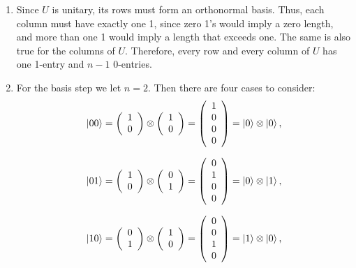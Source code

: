\documentclass [12pt]{article}
\theoremstyle{definition}
\begin{document}
\begin{enumerate}
\item Since $U$ is unitary, its rows must form an orthonormal basis. Thus, each column must have exactly one 1, since zero 1's would imply a zero length, and 
more than one 1 would imply a length that exceeds one. The same is also true for the columns of $U$. Therefore, every row and every column of $U$ has one 1-entry and $n-1$ 0-entries.

\item For the basis step we let $n=2$. Then there are four cases to consider:
\[\ket{00} = 
\left(\begin{array}{c}
1 \\
0\\
\end{array}\right)
\otimes
\left(\begin{array}{c}
1 \\
0\\
\end{array}\right)
=
\left(\begin{array}{c}
1\\
0\\
0\\
0\\
\end{array}\right)
=\ket{0}\otimes \ket{0},
\]

\[\ket{01} = 
\left(\begin{array}{c}
1 \\
0\\
\end{array}\right)
\otimes
\left(\begin{array}{c}
0 \\
1\\
\end{array}\right)
=
\left(\begin{array}{c}
0\\
1\\
0\\
0\\
\end{array}\right)
=\ket{0}\otimes \ket{1},
\]

\[\ket{10} = 
\left(\begin{array}{c}
0 \\
1\\
\end{array}\right)
\otimes
\left(\begin{array}{c}
1 \\
0\\
\end{array}\right)
=
\left(\begin{array}{c}
0\\
0\\
1\\
0\\
\end{array}\right)
=\ket{1}\otimes \ket{0},
\]


\end{enumerate}
\end{document}
